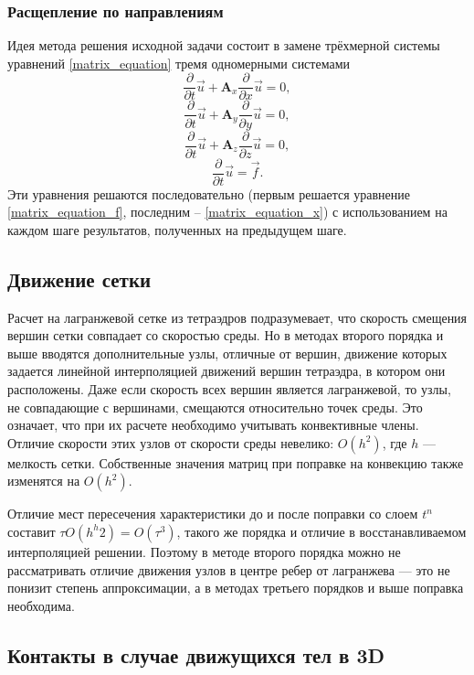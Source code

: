\subsubsection{Расщепление по направлениям}
Идея метода \cite{fedorenko} решения исходной задачи состоит в замене трёхмерной системы
уравнений \ref{matrix_equation} тремя одномерными системами 
\begin{equation}
\frac{\partial}{\partial t}\vec u+\mathbf{A}_x \frac{\partial}{\partial x}\vec u
= 0,
\label{matrix_equation_x}
\end{equation}
\begin{equation}
\frac{\partial}{\partial t}\vec u+\mathbf{A}_y \frac{\partial}{\partial y}\vec u
= 0,
\label{matrix_equation_y}
\end{equation}
\begin{equation}
\frac{\partial}{\partial t}\vec u+\mathbf{A}_z \frac{\partial}{\partial z}\vec u
= 0,
\label{matrix_equation_z}
\end{equation}
\begin{equation}
\frac{\partial}{\partial t}\vec u = \vec f.
\label{matrix_equation_f}
\end{equation}
Эти уравнения решаются последовательно (первым решается уравнение
\ref{matrix_equation_f}, последним -- \ref{matrix_equation_x}) с использованием
на каждом шаге результатов, полученных на предыдущем шаге.


\subsection{Движение сетки}



Расчет на лагранжевой сетке из тетраэдров подразумевает, что скорость 
смещения вершин сетки совпадает со скоростью среды. Но в методах 
второго порядка и выше вводятся дополнительные узлы, отличные от
вершин, движение которых задается линейной интерполяцией движений
вершин тетраэдра, в котором они расположены. Даже если скорость
всех вершин является лагранжевой, то узлы, не совпадающие с вершинами, 
смещаются относительно точек среды. Это означает, что при их расчете
необходимо учитывать конвективные члены. Отличие скорости этих узлов
от скорости среды невелико: $O(h^2)$, где $h$ — мелкость сетки. Собственные
значения матриц при поправке на конвекцию также изменятся на $O(h^2)$.

Отличие мест пересечения характеристики до и после поправки со слоем
$t^n$ составит $\tau O(h^h2) = O(\tau^3)$, такого же порядка и отличие в 
восстанавливаемом интерполяцией решении. Поэтому в методе второго порядка можно
не рассматривать отличие движения узлов в центре ребер от лагранжева
— это не понизит степень аппроксимации, а в методах третьего порядков
и выше поправка необходима.

\subsection{Контакты в случае движущихся тел в 3D}

